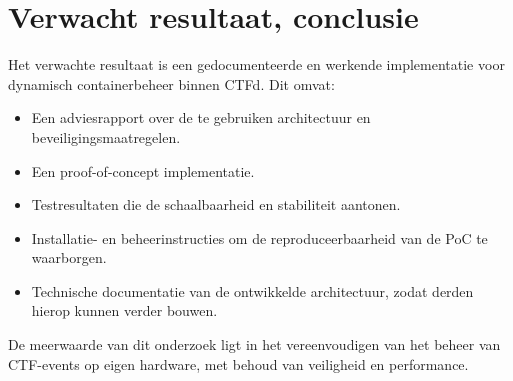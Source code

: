 \section{Verwacht resultaat, conclusie}%
\label{sec:verwachte_resultaten}

Het verwachte resultaat is een gedocumenteerde en werkende implementatie voor dynamisch containerbeheer binnen CTFd. Dit omvat:
\begin{itemize}
	\item Een adviesrapport over de te gebruiken architectuur en beveiligingsmaatregelen.
	\item Een proof-of-concept implementatie.
	\item Testresultaten die de schaalbaarheid en stabiliteit aantonen.
	\item Installatie- en beheerinstructies om de reproduceerbaarheid van de PoC te waarborgen.
	\item Technische documentatie van de ontwikkelde architectuur, zodat derden hierop kunnen verder bouwen.
\end{itemize}

De meerwaarde van dit onderzoek ligt in het vereenvoudigen van het beheer van CTF-events op eigen hardware, met behoud van veiligheid en performance.
